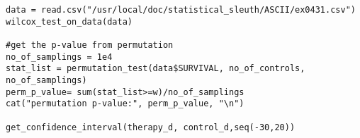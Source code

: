 \documentclass[a4paper,10pt]{article}
\begin{document}
\begin{verbatim}
data = read.csv("/usr/local/doc/statistical_sleuth/ASCII/ex0431.csv")
wilcox_test_on_data(data)

#get the p-value from permutation
no_of_samplings = 1e4
stat_list = permutation_test(data$SURVIVAL, no_of_controls, no_of_samplings)
perm_p_value= sum(stat_list>=w)/no_of_samplings
cat("permutation p-value:", perm_p_value, "\n")

get_confidence_interval(therapy_d, control_d,seq(-30,20))
\end{verbatim}
\end{document}
